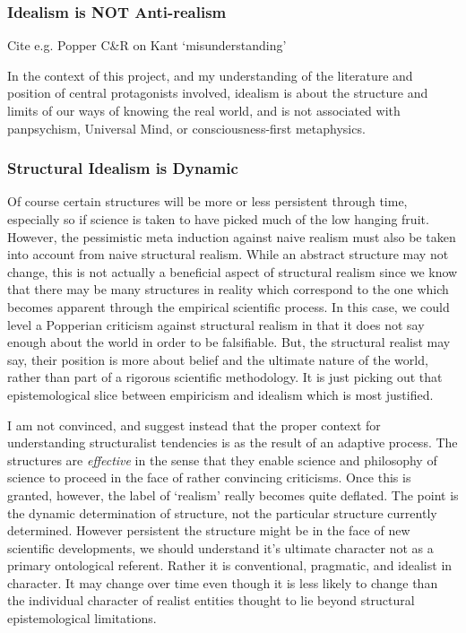 \subsubsection{Idealism is NOT Anti-realism}

Cite e.g. Popper C\&R on Kant `misunderstanding'

In the context of this project, and my understanding of the literature and position of central protagonists involved, idealism is about the structure and limits of our ways of knowing the real world, and is not associated with panpsychism, Universal Mind, or consciousness-first metaphysics.


\subsubsection{Structural Idealism is Dynamic}

Of course certain structures will be more or less persistent through time, especially so if science is taken to have picked much of the low hanging fruit.  However, the pessimistic meta induction against naive realism must also be taken into account from naive structural realism.  While an abstract structure may not change, this is not actually a beneficial aspect of structural realism since we know that there may be many structures in reality which correspond to the one which becomes apparent through the empirical scientific process.  In this case, we could level a Popperian criticism against structural realism in that it does not say enough about the world in order to be falsifiable.  But, the structural realist may say, their position is more about belief and the ultimate nature of the world, rather than part of a rigorous scientific methodology.  It is just picking out that epistemological slice between empiricism and idealism which is most justified.

I am not convinced, and suggest instead that the proper context for understanding structuralist tendencies is as the result of an adaptive process.  The structures are \emph{effective} in the sense that they enable science and philosophy of science to proceed in the face of rather convincing criticisms.  Once this is granted, however, the label of `realism' really becomes quite deflated.  The point is the dynamic determination of structure, not the particular structure currently determined. However persistent the structure might be in the face of new scientific developments, we should understand it's ultimate character not as a primary ontological referent.  Rather it is conventional, pragmatic, and idealist in character.  It may change over time even though it is less likely to change than the individual character of realist entities thought to lie beyond structural epistemological limitations.






